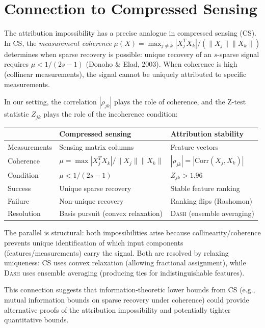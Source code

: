 \documentclass{article}
\newcommand{\DASH}{\textsc{Dash}}
\begin{document}
\section{Connection to Compressed Sensing}

The attribution impossibility has a precise analogue in compressed
sensing (CS). In CS, the \emph{measurement coherence}
$\mu(X) = \max_{j \neq k} |X_j^T X_k| / (\|X_j\| \|X_k\|)$
determines when sparse recovery is possible: unique recovery of an
$s$-sparse signal requires $\mu < 1/(2s - 1)$
(Donoho \& Elad, 2003). When coherence is high (collinear
measurements), the signal cannot be uniquely attributed to specific
measurements.

In our setting, the correlation $|\rho_{jk}|$ plays the role of
coherence, and the Z-test statistic $Z_{jk}$ plays the role of the
incoherence condition:

\begin{center}
\small
\begin{tabular}{@{}lll@{}}
\toprule
& \textbf{Compressed sensing} & \textbf{Attribution stability} \\
\midrule
Measurements & Sensing matrix columns & Feature vectors \\
Coherence & $\mu = \max |X_j^T X_k|/\|X_j\|\|X_k\|$ & $|\rho_{jk}| = |\text{Corr}(X_j, X_k)|$ \\
Condition & $\mu < 1/(2s{-}1)$ & $Z_{jk} > 1.96$ \\
Success & Unique sparse recovery & Stable feature ranking \\
Failure & Non-unique recovery & Ranking flips (Rashomon) \\
Resolution & Basis pursuit (convex relaxation) & \DASH{} (ensemble averaging) \\
\bottomrule
\end{tabular}
\end{center}

The parallel is structural: both impossibilities arise because
collinearity/coherence prevents unique identification of which
input components (features/measurements) carry the signal. Both
are resolved by relaxing uniqueness: CS uses convex relaxation
(allowing fractional assignment), while \DASH{} uses ensemble
averaging (producing ties for indistinguishable features).

This connection suggests that information-theoretic lower bounds
from CS (e.g., mutual information bounds on sparse recovery under
coherence) could provide alternative proofs of the attribution
impossibility and potentially tighter quantitative bounds.
\end{document}
